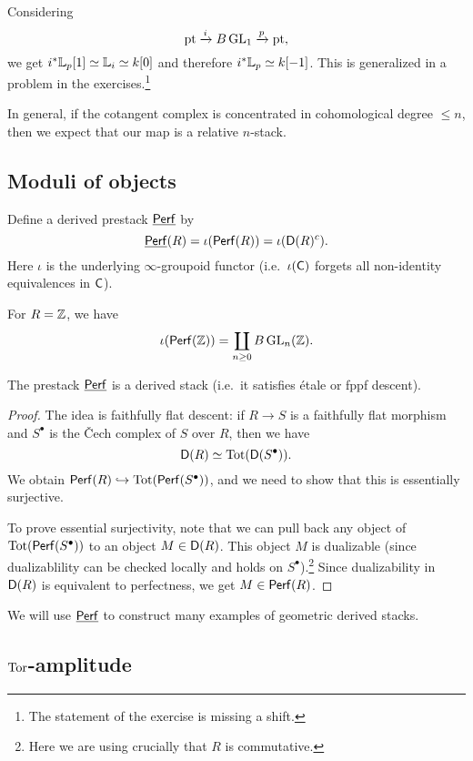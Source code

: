 \documentclass{amsart}
\begin{document}
\begin{ex}
	Considering
	\[
		\operatorname{pt} \xrightarrow{i} B \operatorname{GL}_1 \xrightarrow{p} \operatorname{pt},
	\]
	we get $i^* \mathbb{L}_p[1] \simeq \mathbb{L}_i \simeq k[0]$ and therefore $i^* \mathbb{L}_p \simeq k[-1]$.
	This is generalized in a problem in the exercises.\footnote{The statement of the exercise is missing a shift.}
\end{ex}

In general, if the cotangent complex is concentrated in cohomological degree $\leq n$, then we expect that our map is a relative $n$-stack.

\subsection{Moduli of objects}

Define a derived prestack $\underline{\mathsf{Perf}}$ by
\[
	\underline{\mathsf{Perf}}(R) = \iota(\mathsf{Perf}(R)) = \iota(\mathsf{D}(R)^c).
\]
Here $\iota$ is the underlying $\infty$-groupoid functor (i.e.\ $\iota(\mathsf{C})$ forgets all non-identity equivalences in $\mathsf{C}$).

\begin{ex}
	For $R = \mathbb{Z}$, we have 
	\[
		\iota(\mathsf{Perf}(\mathbb{Z})) = \coprod_{n \geq 0} B \operatorname{GL}_n(\mathbb{Z}).
	\]
\end{ex}

\begin{thm}
	The prestack $\underline{\mathsf{Perf}}$ is a derived stack (i.e.\ it satisfies \'etale or fppf descent).
\end{thm}

\begin{proof}
	The idea is faithfully flat descent: if $R \to S$ is a faithfully flat morphism and $S^\bullet$ is the \v{C}ech complex of $S$ over $R$, then we have
	\[
		\mathsf{D}(R) \simeq \operatorname{Tot}(\mathsf{D}(S^\bullet)).
	\]
	We obtain $\mathsf{Perf}(R) \hookrightarrow \operatorname{Tot}(\mathsf{Perf}(S^\bullet))$, and we need to show that this is essentially surjective.

	To prove essential surjectivity, note that we can pull back any object of $\operatorname{Tot}(\mathsf{Perf}(S^\bullet))$ to an object $M \in \mathsf{D}(R)$.
	This object $M$ is dualizable (since dualizablility can be checked locally and holds on $S^\bullet$).\footnote{Here we are using crucially that $R$ is commutative.}
	Since dualizability in $\mathsf{D}(R)$ is equivalent to perfectness, we get $M \in \mathsf{Perf}(R)$.
\end{proof}

We will use $\underline{\mathsf{Perf}}$ to construct many examples of geometric derived stacks.

\subsection{$\operatorname{Tor}$-amplitude}
\end{document}
